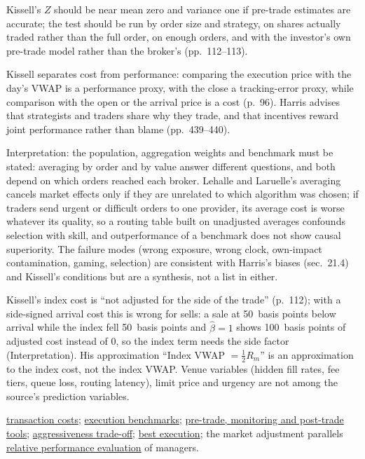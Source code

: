 \begin{qfmethod}
Kissell's $Z$ should be near mean zero and variance one if pre-trade estimates are accurate; the test should be run by order size and strategy, on shares actually traded rather than the full order, on enough orders, and with the investor's own pre-trade model rather than the broker's (pp.~112--113).

 Kissell separates cost from performance: comparing the execution price with the day's VWAP is a performance proxy, with the close a tracking-error proxy, while comparison with the open or the arrival price is a cost (p.~96). Harris advises that strategists and traders share why they trade, and that incentives reward joint performance rather than blame (pp.~439--440).

 Interpretation: the population, aggregation weights and benchmark must be stated: averaging by order and by value answer different questions, and both depend on which orders reached each broker. Lehalle and Laruelle's averaging cancels market effects only if they are unrelated to which algorithm was chosen; if traders send urgent or difficult orders to one provider, its average cost is worse whatever its quality, so a routing table built on unadjusted averages confounds selection with skill, and outperformance of a benchmark does not show causal superiority. The failure modes (wrong exposure, wrong clock, own-impact contamination, gaming, selection) are consistent with Harris's biases (sec.~21.4) and Kissell's conditions but are a synthesis, not a list in either.

Kissell's index cost is ``not adjusted for the side of the trade'' (p.~112); with a side-signed arrival cost this is wrong for sells: a sale at 50~basis points below arrival while the index fell 50~basis points and $\hat\beta=1$ shows 100~basis points of adjusted cost instead of 0, so the index term needs the side factor (Interpretation). His approximation ``Index VWAP $=\tfrac12R_m$'' is an approximation to the index cost, not the index VWAP. Venue variables (hidden fill rates, fee tiers, queue loss, routing latency), limit price and urgency are not among the source's prediction variables.

 \hyperref[def:transaction-costs]{transaction costs}; \hyperref[def:execution-benchmark]{execution benchmarks}; \hyperref[meth:execution-decision-support]{pre-trade, monitoring and post-trade tools}; \hyperref[meth:aggressiveness-tradeoff]{aggressiveness trade-off}; \hyperref[def:best-execution]{best execution}; the market adjustment parallels \hyperref[meth:relative-performance-evaluation]{relative performance evaluation} of managers.

\end{qfmethod}

